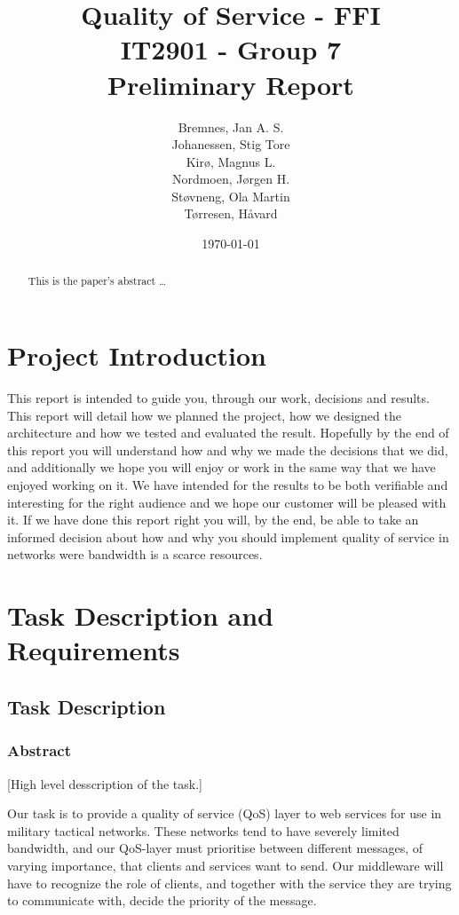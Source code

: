 \documentclass[12pt]{article}
\title{
    Quality of Service - FFI \\
    IT2901 - Group 7  \\ 
    Preliminary Report \\
}
\author{
    Bremnes, Jan A. S. \\  
    Johanessen, Stig Tore \\
    Kirø, Magnus L.\\
    Nordmoen, Jørgen H.\\ 
    Støvneng, Ola Martin  \\
    Tørresen, Håvard \\
}
\date{\today}
\begin{document}
\maketitle
\titlepage
{}
\newpage

\begin{abstract}\label{abstract}
This is the paper's abstract \ldots
\end{abstract}

\tableofcontents
\listoffigures
\listoftables
\newpage

\section{Project Introduction}\label{intoduction}
    This report is intended to guide you, through our work, decisions and results. This report will detail how we planned the project, how we designed the architecture and how we tested and evaluated the result. Hopefully by the end of this report you will understand how and why we made the decisions that we did, and additionally we hope you will enjoy or work in the same way that we have enjoyed working on it. We have intended for the results to be both verifiable and interesting for the right audience and we hope our customer will be pleased with it. If we have done this report right you will, by the end, be able to take an informed decision about how and why you should implement quality of service in networks were bandwidth is a scarce resources.

\section{Task Description and Requirements}\label{taskdescreq}

    \subsection{Task Description}\label{taskdef}
        \subsubsection{Abstract}\label{taskabst} 
        [High level desscription of the task.]
        
        Our task is to provide a quality of service (QoS) layer to web services for use in military tactical networks. These networks tend to have severely limited bandwidth, and our QoS-layer must prioritise between different messages, of varying importance, that clients and services want to send. Our middleware will have to recognize the role of clients, and together with the service they are trying to communicate with, decide the priority of the message.
\end{document}
